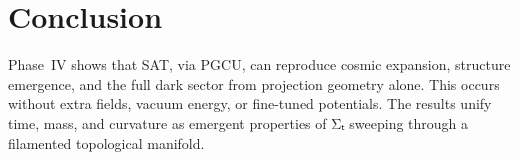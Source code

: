 \section{Conclusion}

Phase~IV shows that SAT, via PGCU, can reproduce cosmic expansion, structure emergence, and the full dark sector from projection geometry alone. This occurs without extra fields, vacuum energy, or fine-tuned potentials. The results unify time, mass, and curvature as emergent properties of Σₜ sweeping through a filamented topological manifold.
